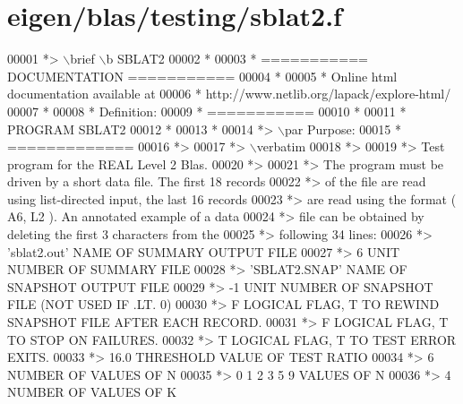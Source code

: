 \hypertarget{eigen_2blas_2testing_2sblat2_8f_source}{}\section{eigen/blas/testing/sblat2.f}
\label{eigen_2blas_2testing_2sblat2_8f_source}

\begin{DoxyCode}
00001 \textcolor{comment}{*> \(\backslash\)brief \(\backslash\)b SBLAT2}
00002 \textcolor{comment}{*}
00003 \textcolor{comment}{*  =========== DOCUMENTATION ===========}
00004 \textcolor{comment}{*}
00005 \textcolor{comment}{* Online html documentation available at }
00006 \textcolor{comment}{*            http://www.netlib.org/lapack/explore-html/ }
00007 \textcolor{comment}{*}
00008 \textcolor{comment}{*  Definition:}
00009 \textcolor{comment}{*  ===========}
00010 \textcolor{comment}{*}
00011 \textcolor{comment}{*       PROGRAM SBLAT2}
00012 \textcolor{comment}{* }
00013 \textcolor{comment}{*}
00014 \textcolor{comment}{*> \(\backslash\)par Purpose:}
00015 \textcolor{comment}{*  =============}
00016 \textcolor{comment}{*>}
00017 \textcolor{comment}{*> \(\backslash\)verbatim}
00018 \textcolor{comment}{*>}
00019 \textcolor{comment}{*> Test program for the REAL Level 2 Blas.}
00020 \textcolor{comment}{*>}
00021 \textcolor{comment}{*> The program must be driven by a short data file. The first 18 records}
00022 \textcolor{comment}{*> of the file are read using list-directed input, the last 16 records}
00023 \textcolor{comment}{*> are read using the format ( A6, L2 ). An annotated example of a data}
00024 \textcolor{comment}{*> file can be obtained by deleting the first 3 characters from the}
00025 \textcolor{comment}{*> following 34 lines:}
00026 \textcolor{comment}{*> 'sblat2.out'      NAME OF SUMMARY OUTPUT FILE}
00027 \textcolor{comment}{*> 6                 UNIT NUMBER OF SUMMARY FILE}
00028 \textcolor{comment}{*> 'SBLAT2.SNAP'     NAME OF SNAPSHOT OUTPUT FILE}
00029 \textcolor{comment}{*> -1                UNIT NUMBER OF SNAPSHOT FILE (NOT USED IF .LT. 0)}
00030 \textcolor{comment}{*> F        LOGICAL FLAG, T TO REWIND SNAPSHOT FILE AFTER EACH RECORD.}
00031 \textcolor{comment}{*> F        LOGICAL FLAG, T TO STOP ON FAILURES.}
00032 \textcolor{comment}{*> T        LOGICAL FLAG, T TO TEST ERROR EXITS.}
00033 \textcolor{comment}{*> 16.0     THRESHOLD VALUE OF TEST RATIO}
00034 \textcolor{comment}{*> 6                 NUMBER OF VALUES OF N}
00035 \textcolor{comment}{*> 0 1 2 3 5 9       VALUES OF N}
00036 \textcolor{comment}{*> 4                 NUMBER OF VALUES OF K}

\end{DoxyCode}
